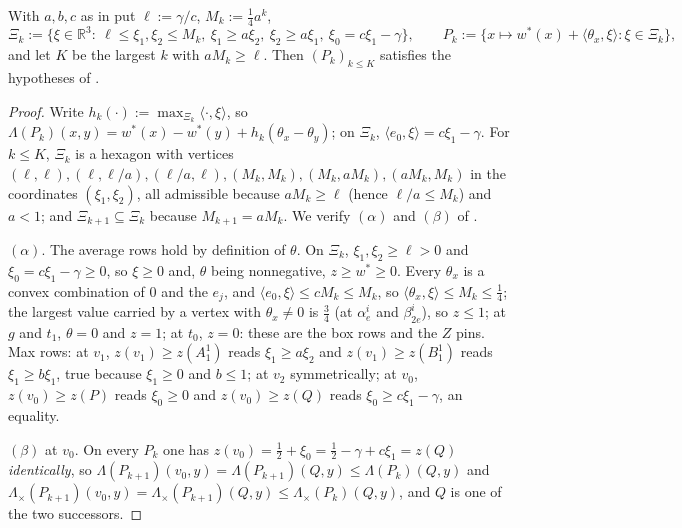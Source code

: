 \begin{theorem}\label{ob:bc-cert}
With $a,b,c$ as in  put $\ell:=\gamma/c$,
$M_k:=\tfrac14a^{k}$,
\[
  \Xi_k:=\bigl\{\xi\in\mathbb R^{3}:\ \ell\le\xi_1,\xi_2\le M_k,\
  \xi_1\ge a\xi_2,\ \xi_2\ge a\xi_1,\ \xi_0=c\xi_1-\gamma\bigr\},\qquad
  P_k:=\{x\mapsto w^\ast(x)+\langle\theta_x,\xi\rangle:\xi\in\Xi_k\},
\]
and let $K$ be the largest $k$ with $aM_k\ge\ell$. Then $(P_k)_{k\le K}$
satisfies the hypotheses of \Cref{ob:invariance}.
\end{theorem}

\begin{proof}
Write $h_k(\cdot):=\max_{\Xi_k}\langle\cdot,\xi\rangle$, so
$\Lambda(P_k)(x,y)=w^\ast(x)-w^\ast(y)+h_k(\theta_x-\theta_y)$; on $\Xi_k$,
$\langle e_0,\xi\rangle=c\xi_1-\gamma$. For $k\le K$, $\Xi_k$ is a
hexagon with vertices
$(\ell,\ell),(\ell,\ell/a),(\ell/a,\ell),(M_k,M_k),(M_k,aM_k),(aM_k,M_k)$
in the coordinates $(\xi_1,\xi_2)$, all admissible because $aM_k\ge\ell$
(hence $\ell/a\le M_k$) and $a<1$; and $\Xi_{k+1}\subseteq\Xi_k$ because
$M_{k+1}=aM_k$. We verify $(\alpha)$ and $(\beta)$ of
.

$(\alpha)$. The average rows hold by definition of $\theta$. On $\Xi_k$,
$\xi_1,\xi_2\ge\ell>0$ and $\xi_0=c\xi_1-\gamma\ge0$, so $\xi\ge0$ and,
$\theta$ being nonnegative, $z\ge w^\ast\ge0$. Every $\theta_x$ is a
convex combination of $0$ and the $e_j$, and
$\langle e_0,\xi\rangle\le cM_k\le M_k$, so
$\langle\theta_x,\xi\rangle\le M_k\le\tfrac14$; the largest value carried
by a vertex with $\theta_x\ne0$ is $\tfrac34$ (at $\alpha^{i}_e$ and
$\beta^{i}_{2e}$), so $z\le1$; at $g$ and $t_1$, $\theta=0$ and $z=1$; at
$t_0$, $z=0$: these are the box rows and the $Z$ pins. Max rows: at
$v_1$, $z(v_1)\ge z(A^{1}_1)$ reads $\xi_1\ge a\xi_2$ and
$z(v_1)\ge z(B^{1}_1)$ reads $\xi_1\ge b\xi_1$, true because $\xi_1\ge0$
and $b\le1$; at $v_2$ symmetrically; at $v_0$, $z(v_0)\ge z(P)$ reads
$\xi_0\ge0$ and $z(v_0)\ge z(Q)$ reads $\xi_0\ge c\xi_1-\gamma$, an
equality.

$(\beta)$ at $v_0$. On every $P_k$ one has
$z(v_0)=\tfrac12+\xi_0=\tfrac12-\gamma+c\xi_1=z(Q)$ \emph{identically},
so $\Lambda(P_{k+1})(v_0,y)=\Lambda(P_{k+1})(Q,y)\le\Lambda(P_k)(Q,y)$
and $\Lambda_\times(P_{k+1})(v_0,y)=\Lambda_\times(P_{k+1})(Q,y)
\le\Lambda_\times(P_k)(Q,y)$, and $Q$ is one of the two successors.


\end{proof}
